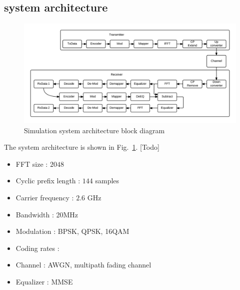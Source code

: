 \subsection{system architecture}
\begin{figure}[t]
\begin{center}
\includegraphics[width=0.95\columnwidth ,angle=0]{figure/systemArch.png}
\caption{Simulation system architecture block diagram}
\label{fig_sys_arch}
\end{center}
\end{figure}
The system architecture is shown in Fig.~\ref{fig_sys_arch}.
[Todo]
\begin{itemize}
  \item FFT size : $2048$
  \item Cyclic prefix length : $144$ samples
  \item Carrier frequency : $2.6$ GHz
  \item Bandwidth : 20MHz
  \item Modulation : BPSK, QPSK, 16QAM
  \item Coding rates : 
  \item Channel : AWGN, multipath fading channel
  \item Equalizer : MMSE
\end{itemize}